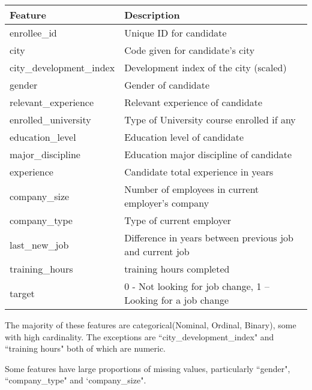\documentclass[11pt]{article}
\begin{document}
\begin{table}[h]
\centering
\begin{tabular}{ |p{4cm}||p{10cm}|  }
 
 \hline
 Feature 		& Description		\\
 \hline
enrollee\_id 	& Unique ID for candidate\\
city			& Code given for candidate's city \\
city\_development\_index & Development index of the city (scaled)\\
gender		& Gender of candidate\\
relevant\_experience & Relevant experience of candidate\\
enrolled\_university & Type of University course enrolled if any \\

education\_level & Education level of candidate\\

major\_discipline & Education major discipline of candidate \\

experience 	& Candidate total experience in years\\

company\_size 	& Number of employees in current employer's company \\

company\_type 	& Type of current employer\\

last\_new\_job 	& Difference in years between previous job and current job \\

training\_hours 	& training hours completed \\

target 		& 0 - Not looking for job change, 1 – Looking for a job change\\
 \hline
\end{tabular}
\end{table}



The majority of these features are categorical(Nominal, Ordinal, Binary), some with high cardinality. The exceptions are ``city\_development\_index" and ``training hours" both of which are numeric. 

Some features have large proportions of missing values, particularly ``gender", ``company\_type" and `company\_size".
\end{document}
